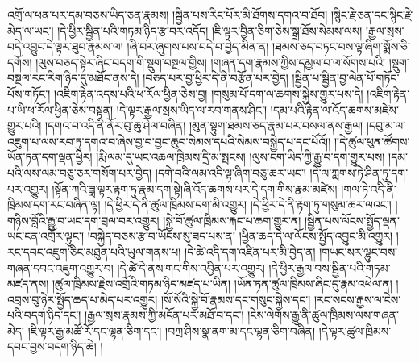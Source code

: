 འགྲོ་ལ་ཕན་པར་དམ་བཅས་ཡིད་ཅན་རྣམས། །སྦྱིན་པས་རིང་པོར་མི་ཐོགས་དགའ་བ་ཐོབ། །སྙིང་རྗེ་ཅན་དང་སྙིང་རྗེ་མེད་ལ་ཡང་། །དེ་ཕྱིར་སྦྱིན་པའི་གཏམ་ཉིད་རྩ་བར་འདོད། །ཇི་ལྟར་བྱིན་ཅིག་ཅེས་སྒྲ་ཐོས་སེམས་ལས། །རྒྱལ་སྲས་བདེ་འབྱུང་དེ་ལྟར་ཐུབ་རྣམས་ལ། །ཞི་བར་ཞུགས་པས་བདེ་བ་བྱེད་མིན་ན། །ཐམས་ཅད་བཏང་བས་ལྟ་ཞིག་སྨོས་ཅི་དགོས། །ལུས་བཅད་སྟེར་ཞིང་བདག་གི་སྡུག་བསྔལ་གྱིས། །གཞན་དག་རྣམས་ཀྱིས་དམྱལ་བ་ལ་སོགས་པའི། །སྡུག་བསྔལ་རང་རིག་ཉིད་དུ་མཐོང་ནས་དེ། །བཅད་པར་བྱ་ཕྱིར་དེ་ནི་བརྩོན་པར་བྱེད། །སྦྱིན་པ་སྦྱིན་བྱ་ལེན་པོ་གཏོང་པོས་གཏོང་། །འཇིག་རྟེན་འདས་པའི་ཕ་རོལ་ཕྱིན་ཅེས་བྱ། །གསུམ་པོ་དག་ལ་ཆགས་སྐྱེས་གྱུར་པས་དེ། །འཇིག་རྟེན་པ་ཡི་ཕ་རོལ་ཕྱིན་ཅེས་བསྟན། །དེ་ལྟར་རྒྱལ་སྲས་ཡིད་ལ་རབ་གནས་ཤིང་། །དམ་པའི་རྟེན་ལ་འོད་ཆགས་མཛེས་གྱུར་པའི། །དགའ་བ་འདི་ནི་ནོར་བུ་ཆུ་ཤེལ་བཞིན། །མུན་སྟུག་ཐམས་ཅད་རྣམ་པར་བསལ་ནས་རྒྱལ། །དབུ་མ་ལ་འཇུག་པ་ལས་རབ་ཏུ་དགའ་བ་ཞེས་བྱ་བ་བྱང་ཆུབ་སེམས་དཔའི་སེམས་བསྐྱེད་པ་དང་པོའོ།། །།དེ་ཚུལ་ཕུན་ཚོགས་ཡོན་ཏན་དག་ལྡན་ཕྱིར། །རྨི་ལམ་དུ་ཡང་འཆལ་ཁྲིམས་དྲི་མ་སྤངས། །ལུས་ངག་ཡིད་ཀྱི་རྒྱུ་བ་དག་གྱུར་པས། །དམ་པའི་ལས་ལམ་བཅུ་ཅར་གསོག་པར་བྱེད། །དགེ་བའི་ལམ་འདི་ལྟ་ཞིག་བཅུ་ཆར་ཡང་། །དེ་ལ་ཀླགས་ཏེ་ཤིན་ཏུ་དག་པར་འགྱུར། །སྟོན་ཀའི་ཟླ་ལྟར་རྟག་ཏུ་རྣམ་དག་སྟེ།ཞི་འོད་ཆགས་པར་དེ་དག་གིས་རྣམ་མཛེས། །གལ་ཏེ་འདི་ནི་ཁྲིམས་དག་རང་བཞིན་ལྟ། །དེ་ཕྱིར་དེ་ནི་ཚུལ་ཁྲིམས་དག་མི་འགྱུར། །དེ་ཕྱིར་དེ་ནི་རྟག་ཏུ་གསུམ་ཆར་ལའང་། །གཉིས་བློའི་རྒྱུ་བ་ཡང་དག་བྲལ་བར་འགྱུར། །སྐྱེ་བོ་ཚུལ་ཁྲིམས་རྐང་པ་ཆག་གྱུར་ན། །སྦྱིན་པས་ལོངས་སྤྱོད་ལྡན་ཡང་ངན་འགྲོར་ལྟུང་། །བསྐྱེད་བཅས་རྩ་བ་ཡོངས་སུ་ཟད་པས་ན། །ཕྱིན་ཆད་དེ་ལ་ལོངས་སྤྱོད་འབྱུང་མི་འགྱུར། །རང་དབང་འཇུག་ཅིང་མཐུན་པའི་ཡུལ་གནས་པ། །དེ་ཚེ་འདི་དག་འཛིན་པར་མི་བྱེད་ན། །གཡང་སར་ལྷུང་བས་གཞན་དབང་འཇུག་འགྱུར་བ། །དེ་ཚེ་དེ་ནས་གང་གིས་འབྱིན་པར་འགྱུར། །དེ་ཕྱིར་རྒྱལ་བས་སྦྱིན་པའི་གཏམ་མཛད་ནས། །ཚུལ་ཁྲིམས་རྗེས་འགྲོའི་གཏམ་ཉིད་མཛད་པ་ཡིན། །ཡོན་ཏན་ཚུལ་ཁྲིམས་ཞིང་དུ་རྣམ་འཕེལ་ན། །འབྲས་བུ་ཉེར་སྤྱོད་ཆད་པ་མེད་པར་འགྱུར། །སོ་སོའི་སྐྱེ་བོ་རྣམས་དང་གསུང་སྐྱེས་དང་། །རང་སངས་རྒྱས་ལ་ངེས་པའི་བདག་ཉིད་དང་། །རྒྱལ་སྲས་རྣམས་ཀྱི་མངོན་པར་མཐོ་བ་དང་། །ངེས་ལེགས་རྒྱུ་ནི་ཚུལ་ཁྲིམས་ལས་གཞན་མེད། །ཇི་ལྟར་རྒྱ་མཚོ་རོ་དང་ལྷན་ཅིག་དང་། །བཀྲ་ཤིས་སྣ་ནག་མ་དང་ལྷན་ཅིག་བཞིན། །དེ་ལྟར་ཚུལ་ཁྲིམས་དབང་བྱས་བདག་ཉིད་ཆེ། །
